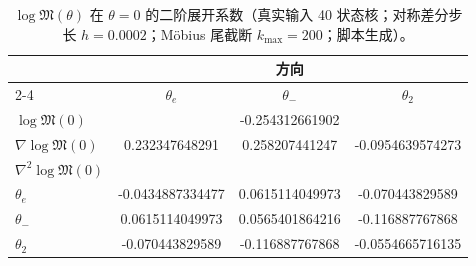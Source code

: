 \begin{table}[H]
\centering
\scriptsize
\setlength{\tabcolsep}{8pt}
\renewcommand{\arraystretch}{1.2}
\caption{$\log\mathfrak{M}(\theta)$ 在 $\theta=0$ 的二阶展开系数（真实输入 40 状态核；对称差分步长 $h=0.0002$；Möbius 尾截断 $k_{\max}=200$；脚本生成）。}
\label{tab:real-input-40-logM-theta-taylor}
\begin{tabular}{@{}lccc@{}}
\toprule
 & \multicolumn{3}{c}{方向} \\
\cmidrule(lr){2-4}
 & $\theta_e$ & $\theta_-$ & $\theta_2$ \\
\midrule
$\log\mathfrak{M}(0)$ & \multicolumn{3}{c}{-0.254312661902} \\
\midrule
$\nabla\log\mathfrak{M}(0)$ & 0.232347648291 & 0.258207441247 & -0.0954639574273 \\
\midrule
$\nabla^2\log\mathfrak{M}(0)$ &  &  &  \\
$\theta_e$ & -0.0434887334477 & 0.0615114049973 & -0.070443829589 \\
$\theta_-$ & 0.0615114049973 & 0.0565401864216 & -0.116887767868 \\
$\theta_2$ & -0.070443829589 & -0.116887767868 & -0.0554665716135 \\
\bottomrule
\end{tabular}
\end{table}
